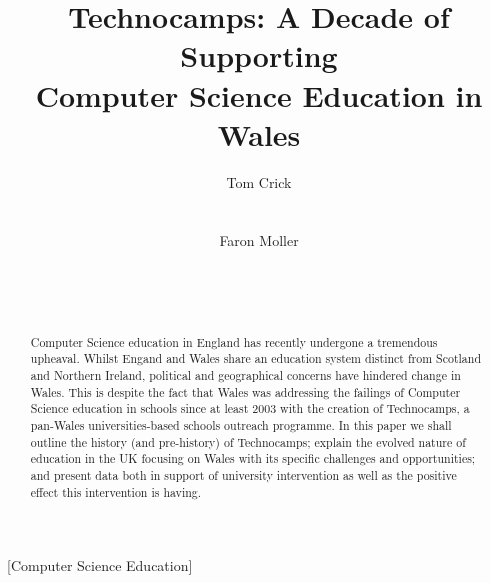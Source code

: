 \documentclass{sig-alternate}
\begin{document}
%

\title{Technocamps: A Decade of Supporting\\Computer Science Education in Wales}

\author{
\alignauthor
Tom Crick\\
\\
\\
\alignauthor
Faron Moller\\
\\
\\
\\
}

\maketitle

\begin{abstract}
Computer Science education in England has recently undergone
a tremendous upheaval.
Whilst Engand and Wales share an education system distinct
from Scotland and Northern Ireland, political and geographical
concerns have hindered change in Wales.
This is despite the fact that Wales was addressing
the failings of Computer Science education in schools
since at least 2003 with the creation of Technocamps,
a pan-Wales universities-based schools outreach programme.
In this paper we shall
outline the history (and pre-history) of Technocamps;
explain the evolved nature of education
in the UK focusing on Wales with its specific
challenges and opportunities;
and present data both in support of
university intervention as well as
the positive effect this intervention is having.
\end{abstract}

[Computer Science Education]
\end{document}
